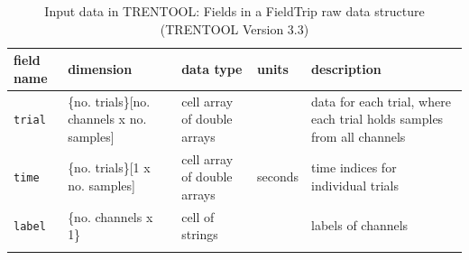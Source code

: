 \documentclass[a4paper,10pt]{article}
\begin{document}
\begin{table}[H]
\small
\caption[Input data]{Input data in TRENTOOL: Fields in a FieldTrip raw data structure (TRENTOOL Version 3.3)} 
\begin{tabular}{p{2cm}p{2.5cm}p{2.5cm}p{1.1cm}p{5.5cm}} \toprule
\textbf{field name} & \textbf{dimension} & \textbf{data type} & \textbf{units} & \textbf{description} \\ \midrule
\verb+trial+ & \{no. trials\}[no. channels x no. samples] & cell array of double arrays & & data for each trial, where each trial holds samples from all channels\\
\rowcolor{Gray}
\verb+time+ & \{no. trials\}[1 x no. samples] & cell array of double arrays  & seconds & time indices for individual trials\\
\verb+label+ & \{no. channels x 1\} & cell of strings & & labels of channels\\
\bottomrule
\label{tab:input_data}
\end{tabular}
\end{table}
\end{document}
